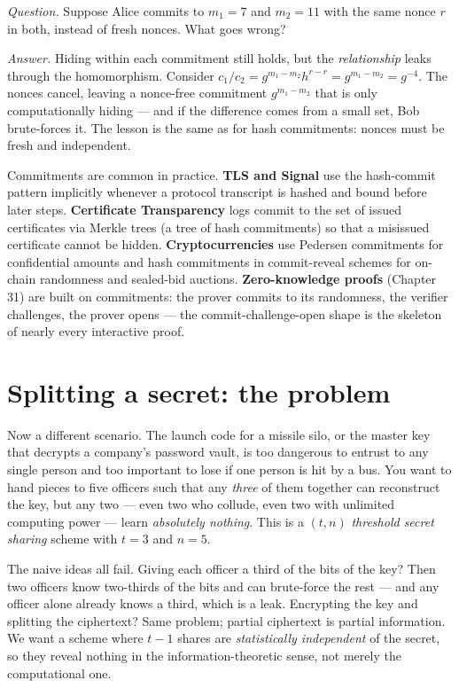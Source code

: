 \begin{walkbox}
\emph{Question.} Suppose Alice commits to $m_1 = 7$ and $m_2 = 11$ with the same nonce $r$ in both, instead of fresh nonces. What goes wrong?

\emph{Answer.} Hiding within each commitment still holds, but the \emph{relationship} leaks through the homomorphism. Consider $c_1 / c_2 = g^{m_1 - m_2} h^{r - r} = g^{m_1 - m_2} = g^{-4}$. The nonces cancel, leaving a nonce-free commitment $g^{m_1-m_2}$ that is only computationally hiding --- and if the difference comes from a small set, Bob brute-forces it. The lesson is the same as for hash commitments: nonces must be fresh and independent.
\end{walkbox}

\begin{applicationbox}
Commitments are common in practice. \textbf{TLS and Signal} use the hash-commit pattern implicitly whenever a protocol transcript is hashed and bound before later steps. \textbf{Certificate Transparency} logs commit to the set of issued certificates via Merkle trees (a tree of hash commitments) so that a misissued certificate cannot be hidden. \textbf{Cryptocurrencies} use Pedersen commitments for confidential amounts and hash commitments in commit-reveal schemes for on-chain randomness and sealed-bid auctions. \textbf{Zero-knowledge proofs} (Chapter 31) are built on commitments: the prover commits to its randomness, the verifier challenges, the prover opens --- the commit-challenge-open shape is the skeleton of nearly every interactive proof.
\end{applicationbox}

\section{Splitting a secret: the problem}
\label{ch32:ss-problem}

Now a different scenario. The launch code for a missile silo, or the master key that decrypts a company's password vault, is too dangerous to entrust to any single person and too important to lose if one person is hit by a bus. You want to hand pieces to five officers such that any \emph{three} of them together can reconstruct the key, but any two --- even two who collude, even two with unlimited computing power --- learn \emph{absolutely nothing}. This is a $(t,n)$ \emph{threshold secret sharing} scheme with $t=3$ and $n=5$.

The naive ideas all fail. Giving each officer a third of the bits of the key? Then two officers know two-thirds of the bits and can brute-force the rest --- and any officer alone already knows a third, which is a leak. Encrypting the key and splitting the ciphertext? Same problem; partial ciphertext is partial information. We want a scheme where $t-1$ shares are \emph{statistically independent} of the secret, so they reveal nothing in the information-theoretic sense, not merely the computational one.

